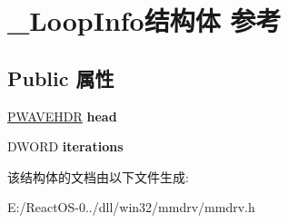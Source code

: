 \hypertarget{struct___loop_info}{}\section{\+\_\+\+Loop\+Info结构体 参考}
\label{struct___loop_info}
\subsection*{Public 属性}
\begin{DoxyCompactItemize}
\item 
\mbox{\label{struct___loop_info_a1f7d8cdcf5394b462a05bc2f8e60f5e1}} 
\hyperlink{structwavehdr__tag}{P\+W\+A\+V\+E\+H\+DR} {\bfseries head}
\item 
\mbox{\label{struct___loop_info_a453500b0d49a5ce241c43b0e5a3f6e56}} 
D\+W\+O\+RD {\bfseries iterations}
\end{DoxyCompactItemize}


该结构体的文档由以下文件生成\+:\begin{DoxyCompactItemize}
\item 
E\+:/\+React\+O\+S-\/0../dll/win32/mmdrv/mmdrv.\+h\end{DoxyCompactItemize}
